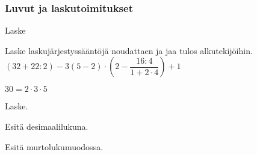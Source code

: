 \subsubsection*{Luvut ja laskutoimitukset}

\begin{tehtava}
	Laske

\begin{vastaus}

\end{vastaus}
\end{tehtava}



\begin{tehtava}
	Laske laskujärjestyssääntöjä noudattaen ja jaa tulos alkutekijöihin. \\
	$(32+22:2)-3(5-2)\cdot\left(2-\dfrac{16:4}{1+2\cdot4}\right)+1$
\begin{vastaus}
	$30=2\cdot3\cdot5$

\end{vastaus}
\end{tehtava}

\begin{tehtava}
	Laske.

\begin{vastaus}
\end{vastaus}
\end{tehtava}





\begin{tehtava}
	Esitä desimaalilukuna.
	

\begin{vastaus}
\end{vastaus}
\end{tehtava}

\begin{tehtava}
	Esitä murtolukumuodossa.
	

\begin{vastaus}
\end{vastaus}
\end{tehtava}

